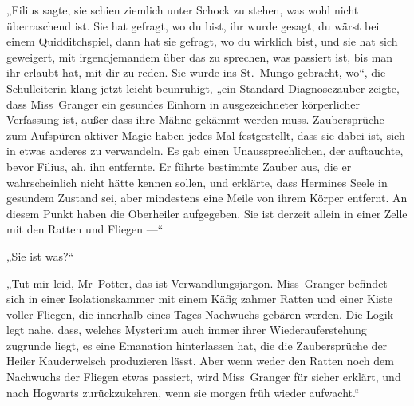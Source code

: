 „Filius sagte, sie schien ziemlich unter Schock zu stehen, was wohl nicht überraschend ist. Sie hat gefragt, wo du bist, ihr wurde gesagt, du wärst bei einem Quidditchspiel, dann hat sie gefragt, wo du wirklich bist, und sie hat sich geweigert, mit irgendjemandem über das zu sprechen, was passiert ist, bis man ihr erlaubt hat, mit dir zu reden. Sie wurde ins St.~Mungo gebracht, wo“, die Schulleiterin klang jetzt leicht beunruhigt, „ein Standard-Diagnosezauber zeigte, dass Miss~Granger ein gesundes Einhorn in ausgezeichneter körperlicher Verfassung ist, außer dass ihre Mähne gekämmt werden muss. Zaubersprüche zum Aufspüren aktiver Magie haben jedes Mal festgestellt, dass sie dabei ist, sich in etwas anderes zu verwandeln. Es gab einen Unaussprechlichen, der auftauchte, bevor Filius, ah, ihn entfernte. Er führte bestimmte Zauber aus, die er wahrscheinlich nicht hätte kennen sollen, und erklärte, dass Hermines Seele in gesundem Zustand sei, aber mindestens eine Meile von ihrem Körper entfernt. An diesem Punkt haben die Oberheiler aufgegeben. Sie ist derzeit allein in einer Zelle mit den Ratten und Fliegen —“

„Sie ist was?“

„Tut mir leid, Mr~Potter, das ist Verwandlungsjargon. Miss~Granger befindet sich in einer Isolationskammer mit einem Käfig zahmer Ratten und einer Kiste voller Fliegen, die innerhalb eines Tages Nachwuchs gebären werden. Die Logik legt nahe, dass, welches Mysterium auch immer ihrer Wiederauferstehung zugrunde liegt, es eine Emanation hinterlassen hat, die die Zaubersprüche der Heiler Kauderwelsch produzieren lässt. Aber wenn weder den Ratten noch dem Nachwuchs der Fliegen etwas passiert, wird Miss~Granger für sicher erklärt, und nach Hogwarts zurückzukehren, wenn sie morgen früh wieder aufwacht.“

